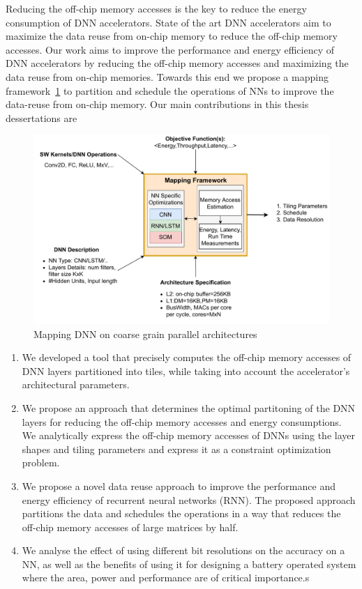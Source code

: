 \documentclass[a4paper,10pt]{article}
\begin{document}
Reducing the off-chip memory accesses is the key to reduce the energy consumption of DNN accelerators. State of the art DNN accelerators aim to maximize the data reuse from on-chip memory to reduce the off-chip memory accesses. Our work aims to improve the performance and energy efficiency of DNN accelerators by reducing the off-chip memory accesses and maximizing the data reuse from on-chip memories. Towards this end we propose a mapping framework~\ref{fig:introduction} to partition and schedule the operations of NNs to improve the data-reuse from on-chip memory. Our main contributions in this thesis dessertations are
\begin{figure}[ht]
	\centering
	\includegraphics[width=0.7\linewidth]{./images/blockDiagram}
	\caption{Mapping DNN on coarse grain parallel architectures}
	\label{fig:introduction}
\end{figure}
\begin{enumerate}
	\item We developed a tool that precisely computes the off-chip memory accesses of DNN layers partitioned into tiles, while taking into account the accelerator's architectural parameters.
	\item We propose an approach that determines the optimal partitoning of the DNN layers for reducing the off-chip memory accesses and energy consumptions. We analytically express the off-chip memory accesses of DNNs  using the layer shapes and tiling parameters and express it as a constraint optimization problem.
	\item We propose a novel data reuse approach to improve the performance and energy efficiency of recurrent neural networks (RNN). The proposed approach partitions the data and schedules the operations in a way that reduces the off-chip memory accesses of large matrices by half.
	\item We analyse the effect of using different bit resolutions on the accuracy on a NN, as well as the benefits of using it for designing a battery operated system where the area, power and performance are of critical importance.s
\end{enumerate}
\end{document}

